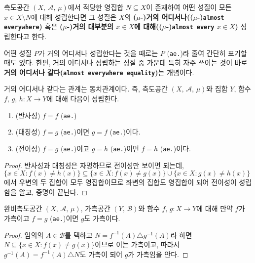 \begin{definition}
    측도공간 $(X,\,\mathcal{A},\,\mu)$에서 적당한 영집합 $N\subseteq X$이 존재하여 어떤 성질이 모든 $x\in X\setminus N$에 대해 성립한다면 그 성질은 $X$의 \textbf{($\mu$-)거의 어디서나(($\mu$-)\texttt{almost everywhere})} 혹은 \textbf{($\mu$-)거의 대부분의 $x\in X$에 대해(($\mu$-)\texttt{almost every} $x\in X$)} 성립한다고 한다.
\end{definition}

어떤 성질 $P$가 거의 어디서나 성립한다는 것을 때로는 $P$ (\texttt{ae.})라 줄여 간단히 표기할 때도 있다. 한편, 거의 어디서나 성립하는 성질 중 가운데 특히 자주 쓰이는 것이 바로 \textbf{거의 어디서나 같다(\texttt{almost everywhere equality})}는 개념이다.

\begin{proposition}
    거의 어디서나 같다는 관계는 동치관계이다. 즉, 측도공간 $(X,\,\mathcal{A},\,\mu)$와 집합 $Y$, 함수 $f,\,g,\,h:X\to Y$에 대해 다음이 성립한다.
    \begin{enumerate}
        \item (반사성) $f=f$ (\texttt{ae.})
        \item (대칭성) $f=g$ (\texttt{ae.})이면 $g=f$ (\texttt{ae.})이다.
        \item (전이성) $f=g$ (\texttt{ae.})이고 $g=h$ (\texttt{ae.})이면 $f=h$ (\texttt{ae.})이다.
    \end{enumerate}
\end{proposition}

\begin{proof}
    반사성과 대칭성은 자명하므로 전이성만 보이면 되는데, $\{x\in X:f(x)\ne h(x)\}\subseteq\{x\in X:f(x)\ne g(x)\}\cup\{x\in X:g(x)\ne h(x)\}$에서 우변의 두 집합이 모두 영집합이므로 좌변의 집합도 영집합이 되어 전이성이 성립함을 알고, 증명이 끝난다.
\end{proof}

\begin{theorem}\label{thm:equalityAeMeasurable}
    완비측도공간 $(X,\,\mathcal{A},\,\mu)$, 가측공간 $(Y,\,\mathcal{B})$와 함수 $f,\,g:X\to Y$에 대해 만약 $f$가 가측이고 $f=g$ (\texttt{ae.})이면 $g$도 가측이다.
\end{theorem}

\begin{proof}
    임의의 $A\in\mathcal{B}$를 택하고 $N=f^{-1}(A)\triangle g^{-1}(A)$라 하면 $N\subseteq\{x\in X:f(x)\ne g(x)\}$이므로 이는 가측이고, 따라서 $g^{-1}(A)=f^{-1}(A)\triangle N$도 가측이 되어 $g$가 가측임을 안다.
\end{proof}

